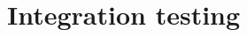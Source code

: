 \documentclass[../main.tex]{subfiles}
\begin{document}
\section{Integration testing}
\end{document}
